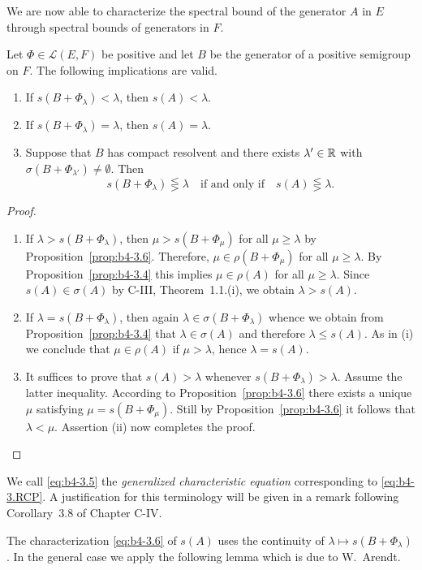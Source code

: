 We are now able to characterize the spectral bound of the generator $A$ in $E$ through spectral bounds of generators in $F$.
\begin{theorem}\label{thm:b4-3.7}
	Let $\Phi \in \mathcal{L}(E,F)$ be positive and let $B$ be the generator of a positive semigroup on $F$. 
	The following implications are valid.
	\begin{enumerate}[\upshape (i)]
		\item If $s(B + \Phi_{\lambda}) < \lambda$, then $s(A) < \lambda$.
        
		\item If $s(B + \Phi_{\lambda}) = \lambda$, then $s(A) = \lambda$.
        
		\item Suppose that $B$ has compact resolvent and there exists $\lambda' \in \mathbb{R}$ with $\sigma(B + \Phi_{\lambda'}) \neq \emptyset$. 
		Then
		\begin{equation}\label{eq:b4-3.6}
		s(B + \Phi_{\lambda}) \lesseqgtr \lambda \quad \text{if and only if} \quad s(A) \lesseqgtr \lambda.
		\end{equation}
	\end{enumerate}
\end{theorem}
\begin{proof}
	\begin{enumerate}[\upshape (i), wide, labelindent=.5em]
	\item 
	If $\lambda > s(B + \Phi_{\lambda})$, then $\mu > s(B + \Phi_{\mu})$ for all $\mu \geq \lambda$ by Proposition~\ref{prop:b4-3.6}.  
	Therefore, $\mu \in \rho(B + \Phi_{\mu})$ for all $\mu \geq \lambda$. 
	By Proposition~\ref{prop:b4-3.4} this implies $\mu \in \rho(A)$ for all $\mu \geq \lambda$. 
	Since $s(A) \in \sigma(A)$ by C-III, Theorem~1.1.(i), we obtain $\lambda > s(A)$.
	
    \item 
	If $\lambda = s(B + \Phi_{\lambda})$, then again $\lambda \in \sigma(B + \Phi_{\lambda})$ whence we obtain from Proposition~\ref{prop:b4-3.4} that $\lambda \in \sigma(A)$ and therefore $\lambda \leq s(A)$. 
	As in (i) we conclude that $\mu \in \rho(A)$ if $\mu > \lambda$, hence $\lambda = s(A)$.
	
	\item 
	It suffices to prove that $s(A) > \lambda$ whenever $s(B + \Phi_{\lambda}) > \lambda$. 
	Assume the latter inequality. 
	According to Proposition~\ref{prop:b4-3.6} there exists a unique $\mu$ satisfying $\mu = s(B + \Phi_{\mu})$. 
	Still by Proposition~\ref{prop:b4-3.6} it follows that $\lambda < \mu$. 
	Assertion (ii) now completes the proof.
	\end{enumerate}
\end{proof}
\begin{remark*}
	We call \eqref{eq:b4-3.5} the \emph{generalized characteristic equation} corresponding to \eqref{eq:b4-3.RCP}. 
	A justification for this terminology will be given in a remark following Corollary~3.8 of Chapter C-IV.
\end{remark*}
The characterization \eqref{eq:b4-3.6} of $s(A)$ uses the continuity of $\lambda \mapsto s(B + \Phi_{\lambda})$. 
In the general case we apply the following lemma which is due to W.~Arendt.

